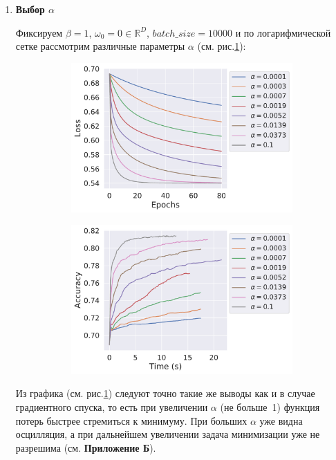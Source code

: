 \begin{enumerate}
	\item {\bfseries  Выбор $\alpha$}
	
	Фиксируем $\beta = 1$, $\omega_0 = 0 \in \mathbb{R}^D$, $batch\_size=10000$ и по логарифмической сетке рассмотрим различные параметры $\alpha$ (см. рис.\ref{eq:exp2_fig1}):
    \begin{figure}[h]
        \begin{subfigure}{.5\textwidth}
            \centering
            \includegraphics[width=\linewidth]{./experiment2/alpha/sgd_loss__iters.pdf}
            \caption{}
        \end{subfigure}%
        \begin{subfigure}{.5\textwidth}
            \centering
            \includegraphics[width=\linewidth]{./experiment2/alpha/sgd_acc_time.pdf}
            \caption{}
        \end{subfigure}
    \caption{}\label{eq:exp2_fig1}
	\end{figure}
	Из графика (см. рис.\ref{eq:exp2_fig1}) следуют точно такие же выводы как и в случае градиентного спуска, то есть при увеличении $\alpha$ (не больше~1) функция потерь быстрее стремиться к минимуму. При больших $\alpha$ уже видна осцилляция, а при дальнейшем увеличении задача минимизации уже не разрешима (см. {\bfseries Приложение Б}).


\end{enumerate}
